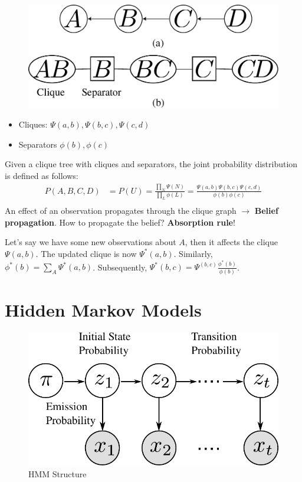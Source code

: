\begin{figure}[h]
	\centering
	\includegraphics[scale=0.5]{./images/hmm/cascade.pdf}
\end{figure}

\begin{itemize}
	\item Cliques: $\Psi(a,b), \Psi(b,c), \Psi(c,d)$
	\item Separators $\phi(b), \phi(c)$
\end{itemize}
Given a clique tree with cliques and separators, the joint probability distribution is defined as follows:
\begin{align*}
	P(A,B,C,D) &= P(U) = \frac{\prod_N \Psi(N)}{\prod_L\phi(L)}= \frac{ \Psi(a,b)\Psi(b,c)\Psi(c,d)}{\phi(b)\phi(c)}\\
\end{align*}
An effect of an observation propagates through the clique graph $\to$ \textbf{Belief propagation}. How to propagate the belief? \textbf{Absorption rule}!

Let's say we have some new observations about $A$, then it affects the clique $\Psi(a,b)$. The updated clique is now $\Psi^*(a,b)$. Similarly, $\phi^*(b) = \sum_A\Psi^*(a,b)$. Subsequently, $\Psi^*(b,c) = \Psi^(b,c)\frac{\phi^*(b)}{\phi(b)}$.

\newpage
\section{Hidden Markov Models}
\label{sec:hmm}

\begin{figure}[h]
	\begin{center}
		\includegraphics[scale=0.7]{./images/hmm/hmm_figure.pdf}
	\end{center}
	\caption{HMM Structure}
	\label{fig:HMM}
\end{figure}

